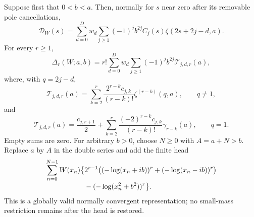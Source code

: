 \begin{theorem}
\label{hqj:thm:compiler}
Suppose first that $0<b<a$. Then, normally for $s$ near zero after its
removable pole cancellations,
\begin{equation}\label{hqj:eq:master-C}
\mathcal D_W(s)=\sum_{d=0}^D w_d\sum_{j\ge1}
(-1)^j b^{2j}C_j(s)\zeta(2s+2j-d,a).
\end{equation}
For every $r\ge1$,
\begin{equation}\label{hqj:eq:compiler}
\boxed{\Delta_r(W;a,b)
=r!\sum_{d=0}^D w_d\sum_{j\ge1}(-1)^j b^{2j}
\mathcal T_{j,d,r}(a),}
\end{equation}
where, with $q=2j-d$,
\begin{equation}\label{hqj:eq:Tnonres}
\mathcal T_{j,d,r}(a)=
\sum_{k=2}^r\frac{2^{r-k}c_{j,k}}{(r-k)!}
\zeta^{(r-k)}(q,a),\qquad q\ne1,
\end{equation}
and
\begin{equation}\label{hqj:eq:Tres}
\mathcal T_{j,d,r}(a)=\frac{c_{j,r+1}}2+
\sum_{k=2}^r\frac{(-2)^{r-k}c_{j,k}}{(r-k)!}
\gamma_{r-k}(a),\qquad q=1.
\end{equation}
Empty sums are zero. For arbitrary $b>0$, choose $N\ge0$ with $A=a+N>b$.
Replace $a$ by $A$ in the double series and add the finite head
\begin{align}
\sum_{n=0}^{N-1}W(x_n)\bigl\{
&2^{r-1}\bigl((-\log(x_n+ib))^r+(-\log(x_n-ib))^r\bigr)
\notag\\[-2pt]
&-(-\log(x_n^2+b^2))^r\bigr\}.
\label{hqj:eq:head}
\end{align}
This is a globally valid normally convergent representation; no
small-mass restriction remains after the head is restored.
\end{theorem}
